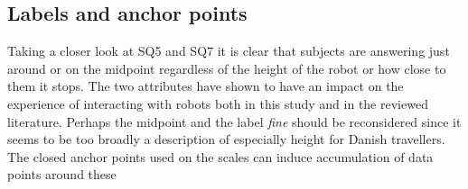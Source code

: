 \subsection{Labels and anchor points}
Taking a closer look at SQ5 and SQ7 it is clear that subjects are answering just around or on the midpoint regardless of the height of the robot or how close to them it stops. The two attributes have shown to have an impact on the experience of interacting with robots both in this study and in the reviewed literature. Perhaps the midpoint and the label \textit{fine} should be reconsidered since it seems to be too broadly a description of especially height for Danish travellers. The closed anchor points used on the scales can induce accumulation of data points around these 